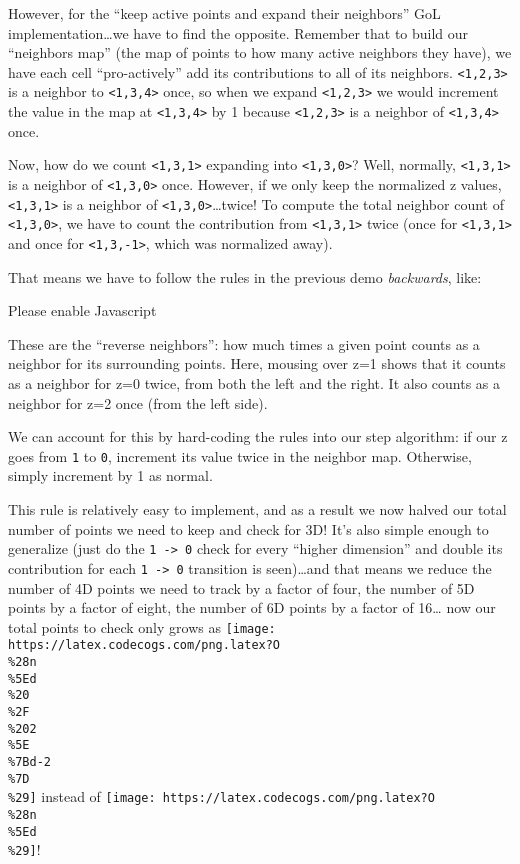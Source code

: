 \documentclass[]{article}
\begin{document}
However, for the ``keep active points and expand their neighbors'' GoL
implementation\ldots we have to find the opposite. Remember that to build our
``neighbors map'' (the map of points to how many active neighbors they have), we
have each cell ``pro-actively'' add its contributions to all of its neighbors.
\texttt{\textless{}1,2,3\textgreater{}} is a neighbor to
\texttt{\textless{}1,3,4\textgreater{}} once, so when we expand
\texttt{\textless{}1,2,3\textgreater{}} we would increment the value in the map
at \texttt{\textless{}1,3,4\textgreater{}} by 1 because
\texttt{\textless{}1,2,3\textgreater{}} is a neighbor of
\texttt{\textless{}1,3,4\textgreater{}} once.

Now, how do we count \texttt{\textless{}1,3,1\textgreater{}} expanding into
\texttt{\textless{}1,3,0\textgreater{}}? Well, normally,
\texttt{\textless{}1,3,1\textgreater{}} is a neighbor of
\texttt{\textless{}1,3,0\textgreater{}} once. However, if we only keep the
normalized z values, \texttt{\textless{}1,3,1\textgreater{}} is a neighbor of
\texttt{\textless{}1,3,0\textgreater{}}\ldots twice! To compute the total
neighbor count of \texttt{\textless{}1,3,0\textgreater{}}, we have to count the
contribution from \texttt{\textless{}1,3,1\textgreater{}} twice (once for
\texttt{\textless{}1,3,1\textgreater{}} and once for
\texttt{\textless{}1,3,-1\textgreater{}}, which was normalized away).

That means we have to follow the rules in the previous demo \emph{backwards},
like:

\leavevmode\hypertarget{golSyms3DReverse}{}%
Please enable Javascript

These are the ``reverse neighbors'': how much times a given point counts as a
neighbor for its surrounding points. Here, mousing over z=1 shows that it counts
as a neighbor for z=0 twice, from both the left and the right. It also counts as
a neighbor for z=2 once (from the left side).

We can account for this by hard-coding the rules into our step algorithm: if our
z goes from \texttt{1} to \texttt{0}, increment its value twice in the neighbor
map. Otherwise, simply increment by 1 as normal.

This rule is relatively easy to implement, and as a result we now halved our
total number of points we need to keep and check for 3D! It's also simple enough
to generalize (just do the \texttt{1\ -\textgreater{}\ 0} check for every
``higher dimension'' and double its contribution for each
\texttt{1\ -\textgreater{}\ 0} transition is seen)\ldots and that means we
reduce the number of 4D points we need to track by a factor of four, the number
of 5D points by a factor of eight, the number of 6D points by a factor of
16\ldots{} now our total points to check only grows as
\texttt{[image: https://latex.codecogs.com/png.latex?O\\\%28n\\\%5Ed\\\%20\\\%2F\\\%202\\\%5E\\\%7Bd-2\\\%7D\\\%29]}
instead of
\texttt{[image: https://latex.codecogs.com/png.latex?O\\\%28n\\\%5Ed\\\%29]}!
\end{document}
